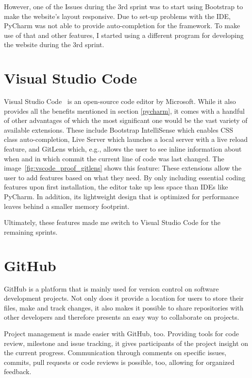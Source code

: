 However, one of the Issues during the 3rd sprint was to start using Bootstrap to make the website's layout responsive. Due to set-up problems with the IDE, PyCharm was not able to provide auto-completion for the framework. To make use of that and other features, I started using a different program for developing the website during the 3rd sprint.

\section{Visual Studio Code}
Visual Studio Code~\cite{vscode} is an open-source code editor by Microsoft. While it also provides all the benefits mentioned in section \ref{pycharm}, it comes with a handful of other advantages of which the most significant one would be the vast variety of available extensions.
These include Bootstrap IntelliSense which enables CSS class auto-completion, Live Server which launches a local server with a live reload feature, and GitLens which, e.g., allows the user to see inline information about when and in which commit the current line of code was last changed. The image~\ref{fig:vscode_proof_gitlens} shows this feature:
These extensions allow the user to add features based on what they need. By only including essential coding features upon first installation, the editor take up less space than IDEs like PyCharm.
In addition, its lightweight design that is optimized for performance leaves behind a smaller memory footprint.

Ultimately, these features made me switch to Visual Studio Code for the remaining sprints.

\section{GitHub}
GitHub is a platform that is mainly used for version control on software development projects. Not only does it provide a location for users to store their files, make and track changes, it also makes it possible to share repositories with other developers and therefore presents an easy way to collaborate on projects.

Project management is made easier with GitHub, too. Providing tools for code review, milestone and issue tracking, it gives participants of the project insight on the current progress. Communication through comments on specific issues, commits, pull requests or code reviews is possible, too, allowing for organized feedback.

